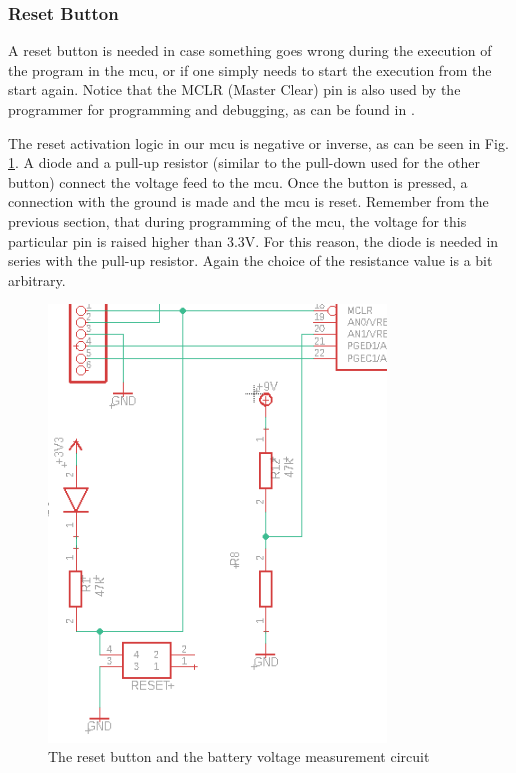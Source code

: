 \FloatBarrier
\vspace{1cm}


\subsubsection{Reset Button}

A reset button is needed in case something goes wrong during the execution of the program in the mcu, or if one simply needs to start the execution from the start again. Notice that the MCLR (Master Clear) pin is also used by the programmer for programming and debugging, as can be found in \cite{mcu}.

The reset activation logic in our mcu is negative or inverse, as can be seen in Fig. \ref{fig:reset}. A diode and a pull-up resistor (similar to the pull-down used for the other button) connect the voltage feed to the mcu. Once the button is pressed, a connection with the ground is made and the mcu is reset. Remember from the previous section, that during programming of the mcu, the voltage for this particular pin is raised higher than 3.3V. For this reason, the diode is needed in series with the pull-up resistor.
Again the choice of the resistance value is a bit arbitrary.

\begin{figure}[htb]
    \centering
    \includegraphics[width=0.8\textwidth]{figures/hardware/MCLRandBatteryMeasurement.PNG}
    \caption{The reset button and the battery voltage measurement circuit}
    \label{fig:reset}
\end{figure}

